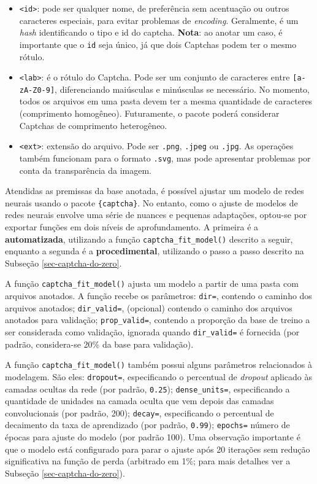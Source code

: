 \documentclass[12pt,twoside,brazilian]{book}
\providecommand{\tightlist}{%
  \setlength{\itemsep}{0pt}\setlength{\parskip}{0pt}}
\begin{document}
\begin{itemize}
\tightlist
\item
  \texttt{\textless{}id\textgreater{}}: pode ser qualquer nome, de
  preferência sem acentuação ou outros caracteres especiais, para evitar
  problemas de \emph{encoding}. Geralmente, é um \emph{hash}
  identificando o tipo e id do captcha. \textbf{Nota}: ao anotar um
  caso, é importante que o \texttt{id} seja único, já que dois Captchas
  podem ter o mesmo rótulo.
\item
  \texttt{\textless{}lab\textgreater{}}: é o rótulo do Captcha. Pode ser
  um conjunto de caracteres entre \texttt{{[}a-zA-Z0-9{]}},
  diferenciando maiúsculas e minúsculas se necessário. No momento, todos
  os arquivos em uma pasta devem ter a mesma quantidade de caracteres
  (comprimento homogêneo). Futuramente, o pacote poderá considerar
  Captchas de comprimento heterogêneo.
\item
  \texttt{\textless{}ext\textgreater{}}: extensão do arquivo. Pode ser
  \texttt{.png}, \texttt{.jpeg} ou \texttt{.jpg}. As operações também
  funcionam para o formato \texttt{.svg}, mas pode apresentar problemas
  por conta da transparência da imagem.
\end{itemize}

Atendidas as premissas da base anotada, é possível ajustar um modelo de
redes neurais usando o pacote \texttt{\{captcha\}}. No entanto, como o
ajuste de modelos de redes neurais envolve uma série de nuances e
pequenas adaptações, optou-se por exportar funções em dois níveis de
aprofundamento. A primeira é a \textbf{automatizada}, utilizando a
função \texttt{captcha\_fit\_model()} descrito a seguir, enquanto a
segunda é a \textbf{procedimental}, utilizando o passo a passo descrito
na Subseção \ref{sec-captcha-do-zero}.

A função \texttt{captcha\_fit\_model()} ajusta um modelo a partir de uma
pasta com arquivos anotados. A função recebe os parâmetros:
\texttt{dir=}, contendo o caminho dos arquivos anotados;
\texttt{dir\_valid=}, (opcional) contendo o caminho dos arquivos
anotados para validação; \texttt{prop\_valid=}, contendo a proporção da
base de treino a ser considerada como validação, ignorada quando
\texttt{dir\_valid=} é fornecida (por padrão, considera-se 20\% da base
para validação).

A função \texttt{captcha\_fit\_model()} também possui alguns parâmetros
relacionados à modelagem. São eles: \texttt{dropout=}, especificando o
percentual de \emph{dropout} aplicado às camadas ocultas da rede (por
padrão, \texttt{0.25}); \texttt{dense\_units=}, especificando a
quantidade de unidades na camada oculta que vem depois das camadas
convolucionais (por padrão, 200); \texttt{decay=}, especificando o
percentual de decaimento da taxa de aprendizado (por padrão,
\texttt{0.99}); \texttt{epochs=} número de épocas para ajuste do modelo
(por padrão 100). Uma observação importante é que o modelo está
configurado para parar o ajuste após 20 iterações sem redução
significativa na função de perda (arbitrado em 1\%; para mais detalhes
ver a Subseção \ref{sec-captcha-do-zero}).
\end{document}
